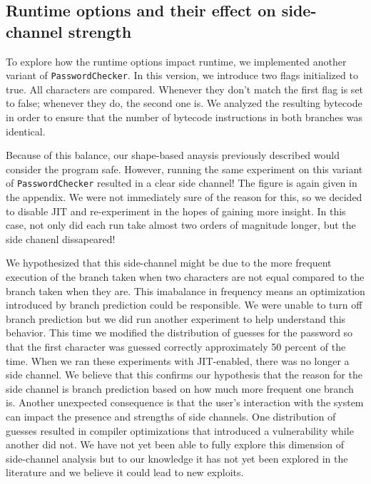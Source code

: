 \subsection{Runtime options and their effect on side-channel strength}
To explore how the runtime options impact runtime, we implemented another variant of \texttt{PasswordChecker}. In this version, we introduce two flags initialized to true. All characters are compared. Whenever they don't match the first flag is set to false; whenever they do, the second one is. We analyzed the resulting bytecode in order to ensure that the number of bytecode instructions in both branches was identical. 

Because of this balance, our shape-based anaysis previously described would consider the program safe. However, running the same experiment on this variant of \texttt{PasswordChecker} resulted in a clear side channel! The figure is again given in the appendix. We were not immediately sure of the reason for this, so we decided to disable JIT and re-experiment in the hopes of gaining more insight. In this case, not only did each run take almost two orders of magnitude longer, but the side chanenl dissapeared!

We hypothesized that this side-channel might be due to the more frequent execution of the branch taken when two characters are not equal compared to the branch taken when they are. This imabalance in frequency means an optimization introduced by branch prediction could be responsible. We were unable to turn off branch prediction but we did run another experiment to help understand this behavior. This time we modified the distribution of guesses for the password so that the first character was guessed correctly approximately 50 percent of the time. When we ran these experiments with JIT-enabled, there was no longer a side channel. We believe that this confirms our hypothesis that the reason for the side channel is branch prediction based on how much more frequent one branch is. Another unexpected consequence is that the user's interaction with the system can impact the presence and strengths of side channels. One distribution of guesses resulted in compiler optimizations that introduced a vulnerability while another did not. We have not yet been able to fully explore this dimension of side-channel analysis but to our knowledge it has not yet been explored in the literature and we believe it could lead to new exploits. 

